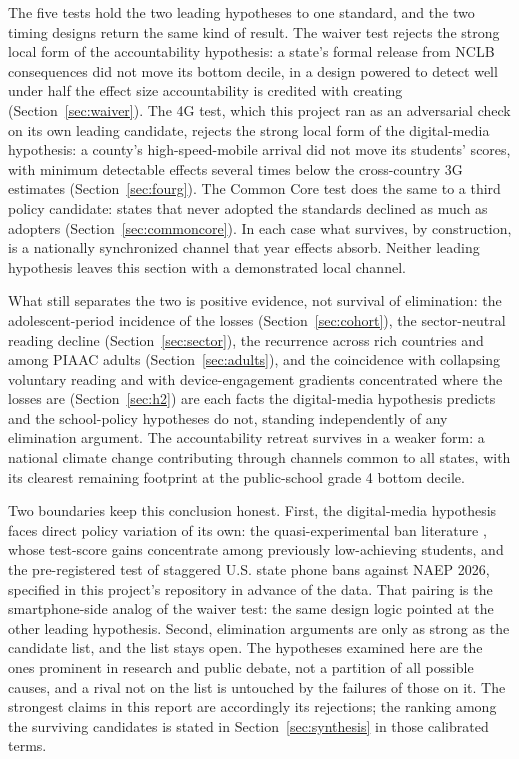 \documentclass[11pt]{article}
\begin{document}
The five tests hold the two leading hypotheses to one standard, and the two timing designs return the same kind of result. The waiver test rejects the strong local form of the accountability hypothesis: a state's formal release from NCLB consequences did not move its bottom decile, in a design powered to detect well under half the effect size accountability is credited with creating (Section~\ref{sec:waiver}). The 4G test, which this project ran as an adversarial check on its own leading candidate, rejects the strong local form of the digital-media hypothesis: a county's high-speed-mobile arrival did not move its students' scores, with minimum detectable effects several times below the cross-country 3G estimates (Section~\ref{sec:fourg}). The Common Core test does the same to a third policy candidate: states that never adopted the standards declined as much as adopters (Section~\ref{sec:commoncore}). In each case what survives, by construction, is a nationally synchronized channel that year effects absorb. Neither leading hypothesis leaves this section with a demonstrated local channel.

What still separates the two is positive evidence, not survival of elimination: the adolescent-period incidence of the losses (Section~\ref{sec:cohort}), the sector-neutral reading decline (Section~\ref{sec:sector}), the recurrence across rich countries and among PIAAC adults (Section~\ref{sec:adults}), and the coincidence with collapsing voluntary reading and with device-engagement gradients concentrated where the losses are (Section~\ref{sec:h2}) are each facts the digital-media hypothesis predicts and the school-policy hypotheses do not, standing independently of any elimination argument. The accountability retreat survives in a weaker form: a national climate change contributing through channels common to all states, with its clearest remaining footprint at the public-school grade 4 bottom decile.

Two boundaries keep this conclusion honest. First, the digital-media hypothesis faces direct policy variation of its own: the quasi-experimental ban literature \citep{belandmurphy2016,abrahamsson2024,beneito2022,figlio2025}, whose test-score gains concentrate among previously low-achieving students, and the pre-registered test of staggered U.S. state phone bans against NAEP 2026, specified in this project's repository in advance of the data. That pairing is the smartphone-side analog of the waiver test: the same design logic pointed at the other leading hypothesis. Second, elimination arguments are only as strong as the candidate list, and the list stays open. The hypotheses examined here are the ones prominent in research and public debate, not a partition of all possible causes, and a rival not on the list is untouched by the failures of those on it. The strongest claims in this report are accordingly its rejections; the ranking among the surviving candidates is stated in Section~\ref{sec:synthesis} in those calibrated terms.
\end{document}

